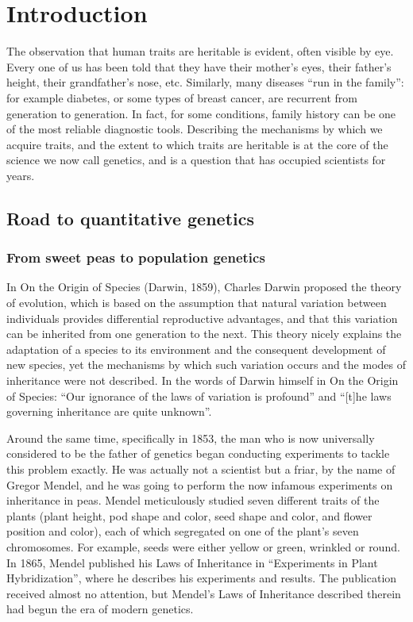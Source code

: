 \chapter{Introduction}  %

The observation that human traits are heritable is evident, often visible by eye. Every one of us has been told that they have their mother’s eyes, their father’s height, their grandfather’s nose, etc. Similarly, many diseases “run in the family”: for example diabetes, or some types of breast cancer, are recurrent from generation to generation. In fact, for some conditions, family history can be one of the most reliable diagnostic tools. Describing the mechanisms by which we acquire traits, and the extent to which traits are heritable is at the core of the science we now call genetics, and is a question that has occupied scientists for years.

\section{Road to quantitative genetics}  %

\subsection{From sweet peas to population genetics} %
In On the Origin of Species (Darwin, 1859), Charles Darwin proposed the theory of evolution, which is based on the assumption that natural variation between individuals provides differential reproductive advantages, and that this variation can be inherited from one generation to the next. This theory nicely explains the adaptation of a species to its environment and the consequent development of new species, yet the mechanisms by which such variation occurs and the modes of inheritance were not described. In the words of Darwin himself in On the Origin of Species: “Our ignorance of the laws of variation is profound” and “[t]he laws governing inheritance are quite unknown”.

Around the same time, specifically in 1853, the man who is now universally considered to be the father of genetics began conducting experiments to tackle this problem exactly. He was actually not a scientist but a friar, by the name of Gregor Mendel, and he was going to perform the now infamous experiments on inheritance in peas. Mendel meticulously studied seven different traits of the plants (plant height, pod shape and color, seed shape and color, and flower position and color), each of which segregated on one of the plant's seven chromosomes. For example, seeds were either yellow or green, wrinkled or round. In 1865, Mendel published his Laws of Inheritance in “Experiments in Plant Hybridization”, where he describes his experiments and results. The publication received almost no attention, but Mendel's Laws of Inheritance described therein had begun the era of modern genetics.

